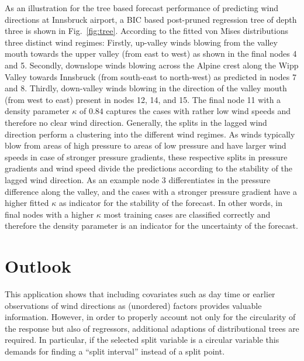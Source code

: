 \documentclass[twoside]{report}
\begin{document}
As an illustration for the tree based forecast performance of predicting wind
directions at Innsbruck airport, a BIC based post-pruned regression tree of
depth three is shown in Fig.~\ref{fig:tree}. According to the fitted von Mises
distributions three distinct wind regimes: Firstly, up-valley winds blowing
from the valley mouth towards the upper valley (from east to west) as shown in
the final nodes 4 and 5. Secondly, downslope winds blowing across the Alpine
crest along the Wipp Valley towards Innsbruck (from south-east to north-west)
as predicted in nodes 7 and 8. Thirdly, down-valley winds blowing in the
direction of the valley mouth (from west to east) present in nodes 12, 14, and
15. The final node 11 with a density parameter $\kappa$ of $0.84$ captures the
cases with rather low wind speeds and therefore no clear wind direction.
Generally, the splits in the lagged wind direction perform a clustering into
the different wind regimes. As winds typically blow from areas of high pressure
to areas of low pressure and have larger wind speeds in case of stronger
pressure gradients, these respective splits in pressure gradients and wind
speed divide the predictions according to the stability of the lagged wind
direction. As an example node 3 differentiates in the pressure difference along
the valley, and the cases with a stronger pressure gradient have a higher
fitted $\kappa$ as indicator for the stability of the forecast. In other words,
in final nodes with a higher $\kappa$ most training cases are classified
correctly and therefore the density parameter is an indicator for the
uncertainty of the forecast. 

\section{Outlook}

This application shows that including covariates such as day time or earlier observations 
of wind directions as (unordered) factors provides valuable information. However, in order 
to properly account not only for the circularity of the response but also of regressors, 
additional adaptions of distributional trees are required. 
In particular, if the selected split variable is a circular variable this demands for 
finding a ``split interval'' instead of a split point.
\end{document}

